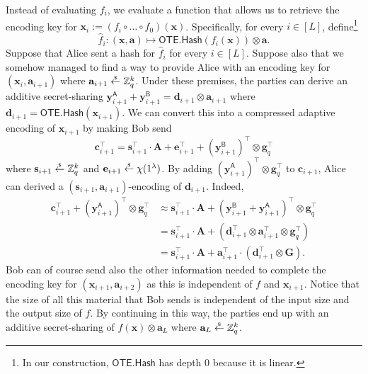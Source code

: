 \documentclass{article}
\newcommand{\getsr}{\overset{\raisebox{-1pt}{$\scriptscriptstyle \$$}}{\gets}}
\newcommand{\sample}{\getsr}
\newcommand{\OTE}{\mathsf{OTE}}
\newcommand{\Z}{\mathbb{Z}}
\renewcommand{\sec}{\ensuremath{\lambda}}
\newcommand{\algofont}[1]{\ensuremath{\mathsf{#1}}}
\newcommand{\Hash}{{\algofont{Hash}}}
\newcommand\bbbone{1}
\begin{document}
Instead of evaluating $f_i$, we evaluate a function that allows us to retrieve the encoding key for $\mathbf{x}_i:=(f_i\circ \dots\circ f_0)(\mathbf{x})$. Specifically, for every $i\in[L]$, define\footnote{In our construction, $\OTE.\Hash$ has depth 0 because it is linear.}
\[\hat{f}_i:(\mathbf{x}, \mathbf{a})\longmapsto \OTE.\Hash(f_i(\mathbf{x}))\otimes \mathbf{a}.\] Suppose that Alice sent a hash for $\hat{f}_{i}$ for every $i\in[L]$. Suppose also that we somehow managed to find a way to provide Alice with an encoding key for $(\mathbf{x}_i, \mathbf{a}_{i+1})$ where $\mathbf{a}_{i+1}\sample\Z_q^k$. Under these premises, the parties can derive an additive secret-sharing $\mathbf{y}^{\mathsf{A}}_{i+1}+\mathbf{y}^{\mathsf{B}}_{i+1}=\mathbf{d}_{i+1}\otimes \mathbf{a}_{i+1}$ where $\mathbf{d}_{i+1}=\OTE.\Hash(\mathbf{x}_{i+1})$. We can convert this into a compressed adaptive encoding of $\mathbf{x}_{i+1}$ by making Bob send \[\mathbf{c}_{i+1}^\intercal=\mathbf{s}_{i+1}^\intercal\cdot \mathbf{A}+\mathbf{e}_{i+1}^\intercal+(\mathbf{y}^{\mathsf{B}}_{i+1})^\intercal\otimes \mathbf{g}_q^\intercal\] where $\mathbf{s}_{i+1}\sample\Z_q^k$ and $\mathbf{e}_{i+1}\sample\chi(\bbbone^\sec)$. By adding $(\mathbf{y}^{\mathsf{A}}_{i+1})^\intercal\otimes\mathbf{g}_q^\intercal$ to $\mathbf{c}_{i+1}$, Alice can derived a $(\mathbf{s}_{i+1}, \mathbf{a}_{i+1})$-encoding of $\mathbf{d}_{i+1}$. Indeed,
\begin{align*}
    \mathbf{c}_{i+1}^\intercal+(\mathbf{y}^{\mathsf{A}}_{i+1})^\intercal\otimes\mathbf{g}_q^\intercal&\approx \mathbf{s}_{i+1}^\intercal\cdot \mathbf{A}+(\mathbf{y}^{\mathsf{B}}_{i+1}+\mathbf{y}^{\mathsf{A}}_{i+1})^\intercal\otimes \mathbf{g}_q^\intercal\\
    &=\mathbf{s}_{i+1}^\intercal\cdot \mathbf{A}+(\mathbf{d}_{i+1}^\intercal\otimes \mathbf{a}_{i+1}^\intercal\otimes \mathbf{g}_q^\intercal)\\
    &=\mathbf{s}_{i+1}^\intercal\cdot \mathbf{A}+\mathbf{a}_{i+1}^\intercal\cdot (\mathbf{d}_{i+1}^\intercal\otimes \mathbf{G}).
\end{align*}Bob can of course send also the other information needed to complete the encoding key for $(\mathbf{x}_{i+1}, \mathbf{a}_{i+2})$ as this is independent of $f$ and $\mathbf{x}_{i+1}$. Notice that the size of all this material that Bob sends is independent of the input size and the output size of $f$. By continuing in this way, the parties end up with an additive secret-sharing of $f(\mathbf{x})\otimes \mathbf{a}_L$ where $\mathbf{a}_L\sample\Z_q^k$.
\end{document}
